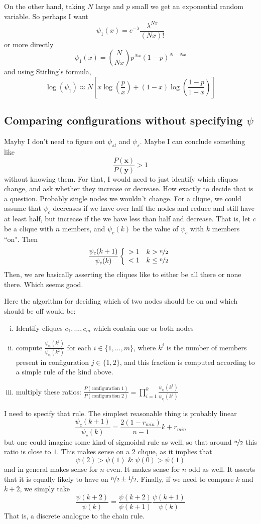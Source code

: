 \documentclass[10pt]{article}
\theoremstyle{definition}
\numberwithin{theorem}{section}
\numberwithin{definition}{section}
\numberwithin{lemma}{section}
\numberwithin{corollary}{section}
\numberwithin{clm}{section}
\numberwithin{rmk}{section}
\renewcommand{\b}{\bm}
\begin{document}
On the other hand, taking $N$ large and $p$ small we get an exponential random variable. So perhaps I want
\[
\psi_1(x) = e^{-\lambda}\frac{\lambda^{Nx}}{(Nx)!}
\]
or more directly
\[
\psi_1(x) = \binom{N}{Nx}p^{Nx}(1-p)^{N-Nx}
\]
and using Stirling's formula,
\[
\log(\psi_1) \approx N\left[x \log\left(\frac{p}{x}\right) + (1-x)\log\left(\frac{1-p}{1-x}\right)\right]
\]

\subsection{Comparing configurations without specifying $\psi$}
Mayby I don't need to figure out $\psi_{st}$ and $\psi_s$. Maybe I can conclude something like 
\[
\frac{P(\b{x})}{P(\b{y})} > 1
\]
without knowing them. For that, I would need to just identify which cliques change, and ask whether they increase or decrease. How exactly to decide that is a question. Probably single nodes we wouldn't change. For a clique, we could assume that $\psi_c$ decreases if we have over half the nodes and reduce and still have at least half, but increase if the we have less than half and decrease. That is, let $c$ be a clique with $n$ members, and $\psi_c(k)$ be the value of $\psi_c$ with $k$ members ``on". Then
\[
\frac{\psi_c(k+1)}{\psi_c(k)}   \left\{\begin{array}{c c}
>1 & k>\nicefrac{n}{2}\\
<1 & k\leq \nicefrac{n}{2}
\end{array}\right.
\]
Then, we are basically asserting the cliques like to either be all there or none there. Which seems good.

Here the algorithm for deciding which of two nodes should be on and which should be off would be:
\begin{enumerate}[(i)]
	\item Identify cliques $c_1,...,c_m$ which contain one or both nodes
	\item compute $\frac{\psi_{c_i}(k^1)}{\psi_{c_i}(k^2)}$ for each  $i \in \{1,...,m\}$, where $k^j$ is the number of members present in configuration $j \in \{1,2\}$, and this fraction is computed according to a simple rule of the kind above.
	\item multiply these ratios: $\frac{P(\text{configuration 1})}{P(\text{configuration 2})} = \prod_{i=1}^k \frac{\psi_{c_i}(k^1)}{\psi_{c_i}(k^2)}$
\end{enumerate}

I need to specify that rule. The simplest reasonable thing is probably linear
\[
\frac{\psi_c(k+1)}{\psi_c(k)} = \frac{2(1-r_{min})}{n - 1} k + r_{min}
\]
but one could imagine some kind of sigmoidal rule as well, so that around $\nicefrac{n}{2}$ this ratio is close to $1$. This makes sense on a $2$ clique, as it implies that
\[
\psi(2) > \psi(1) \; \& \; \psi(0) > \psi(1)
\]
and in general makes sense for $n$ even. It makes sense for $n$ odd as well. It asserts that it is equally likely to have on $\nicefrac{n}{2} \pm \nicefrac{1}{2}$. Finally, if we need to compare $k$ and $k+2$, we simply take
\[
\frac{\psi(k+2)}{\psi(k)} = \frac{\psi(k+2)}{\psi(k+1)}\frac{\psi(k+1)}{\psi(k)}
\]
That is, a discrete analogue to the chain rule.
\end{document}

